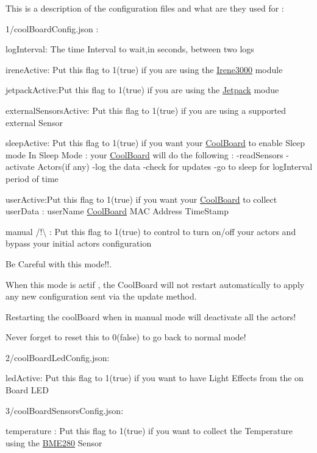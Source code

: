 This is a description of the configuration files and what are they used for \+:

1/cool\+Board\+Config.\+json \+:

log\+Interval\+: The time Interval to wait,in seconds, between two logs

irene\+Active\+: Put this flag to 1(true) if you are using the \hyperlink{class_irene3000}{Irene3000} module

jetpack\+Active\+:Put this flag to 1(true) if you are using the \hyperlink{class_jetpack}{Jetpack} modue

external\+Sensors\+Active\+: Put this flag to 1(true) if you are using a supported external Sensor

sleep\+Active\+: Put this flag to 1(true) if you want your \hyperlink{class_cool_board}{Cool\+Board} to enable Sleep mode In Sleep Mode \+: your \hyperlink{class_cool_board}{Cool\+Board} will do the following \+: -\/read\+Sensors -\/activate Actors(if any) -\/log the data -\/check for updates -\/go to sleep for log\+Interval period of time

user\+Active\+:Put this flag to 1(true) if you want your \hyperlink{class_cool_board}{Cool\+Board} to collect user\+Data \+: user\+Name \hyperlink{class_cool_board}{Cool\+Board} M\+AC Address Time\+Stamp

manual /!\textbackslash{} \+: Put this flag to 1(true) to control to turn on/off your actors and bypass your initial actors configuration \begin{DoxyVerb}         Be Careful with this mode!!.

         When this mode is actif , the CoolBoard will not restart automatically to apply any new configuration sent via
         the update method.

         Restarting the coolBoard when in manual mode will deactivate all the actors!

         Never forget to reset this to 0(false) to go back to normal mode!
\end{DoxyVerb}


2/cool\+Board\+Led\+Config.\+json\+:

led\+Active\+: Put this flag to 1(true) if you want to have Light Effects from the on Board L\+ED

3/cool\+Board\+Sensors\+Config.\+json\+:

temperature \+: Put this flag to 1(true) if you want to collect the Temperature using the \hyperlink{class_b_m_e280}{B\+M\+E280} Sensor

